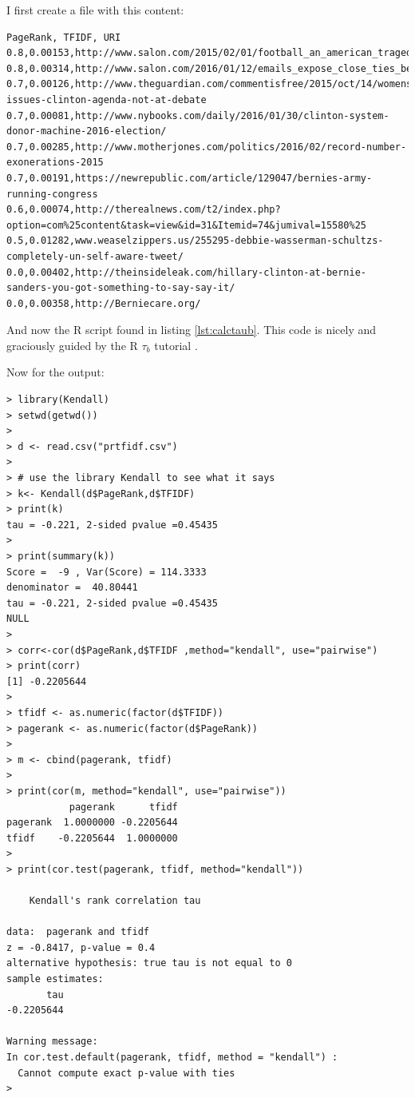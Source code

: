 \documentclass[letterpaper,10pt]{article}
\begin{document}
I first create a file with this content:
\begin{verbatim}
PageRank, TFIDF, URI 
0.8,0.00153,http://www.salon.com/2015/02/01/football_an_american_tragedy/}
0.8,0.00314,http://www.salon.com/2016/01/12/emails_expose_close_ties_between_hillary_clinton_and_accused_war_criminal_henry_kissinger/
0.7,0.00126,http://www.theguardian.com/commentisfree/2015/oct/14/womens-issues-clinton-agenda-not-at-debate 
0.7,0.00081,http://www.nybooks.com/daily/2016/01/30/clinton-system-donor-machine-2016-election/ 
0.7,0.00285,http://www.motherjones.com/politics/2016/02/record-number-exonerations-2015 
0.7,0.00191,https://newrepublic.com/article/129047/bernies-army-running-congress 
0.6,0.00074,http://therealnews.com/t2/index.php?option=com%25content&task=view&id=31&Itemid=74&jumival=15580%25
0.5,0.01282,www.weaselzippers.us/255295-debbie-wasserman-schultzs-completely-un-self-aware-tweet/
0.0,0.00402,http://theinsideleak.com/hillary-clinton-at-bernie-sanders-you-got-something-to-say-say-it/
0.0,0.00358,http://Berniecare.org/ 
\end{verbatim}
And now the R script found in listing \ref{lst:calctaub}. This code is nicely and graciously guided by the R $\tau_b$ tutorial \cite{taubr}.  


Now for the output:

\begin{verbatim}
> library(Kendall)
> setwd(getwd())
> 
> d <- read.csv("prtfidf.csv")
> 
> # use the library Kendall to see what it says
> k<- Kendall(d$PageRank,d$TFIDF)
> print(k)
tau = -0.221, 2-sided pvalue =0.45435
> 
> print(summary(k))
Score =  -9 , Var(Score) = 114.3333
denominator =  40.80441
tau = -0.221, 2-sided pvalue =0.45435
NULL
> 
> corr<-cor(d$PageRank,d$TFIDF ,method="kendall", use="pairwise")
> print(corr)
[1] -0.2205644
> 
> tfidf <- as.numeric(factor(d$TFIDF))
> pagerank <- as.numeric(factor(d$PageRank))
> 
> m <- cbind(pagerank, tfidf) 
> 
> print(cor(m, method="kendall", use="pairwise")) 
           pagerank      tfidf
pagerank  1.0000000 -0.2205644
tfidf    -0.2205644  1.0000000
> 
> print(cor.test(pagerank, tfidf, method="kendall"))

	Kendall's rank correlation tau

data:  pagerank and tfidf
z = -0.8417, p-value = 0.4
alternative hypothesis: true tau is not equal to 0
sample estimates:
       tau 
-0.2205644 

Warning message:
In cor.test.default(pagerank, tfidf, method = "kendall") :
  Cannot compute exact p-value with ties
> 
\end{verbatim}
\end{document}
